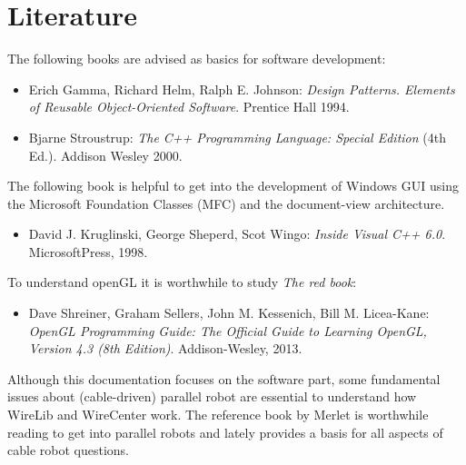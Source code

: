 \documentclass[11pt,a4paper,onepage,openany]{book}
\begin{document}
\appendix





\chapter{Literature}
The following books are advised as basics for software development:
\begin{itemize}
\item Erich Gamma, Richard Helm, Ralph E. Johnson: \emph{Design Patterns.
    Elements of Reusable Object-Oriented Software}. Prentice Hall 1994.

\item Bjarne Stroustrup: \emph{The C++ Programming Language: Special
    Edition}
    (4th Ed.). Addison Wesley 2000.
\end{itemize}
The following book is helpful to get into the development of Windows GUI using
the Microsoft Foundation Classes (MFC) and the document-view architecture.
\begin{itemize}
\item David J. Kruglinski, George Sheperd, Scot Wingo: \emph{Inside Visual
    C++ 6.0}. MicrosoftPress, 1998.
\end{itemize}
To understand openGL it is worthwhile to study \emph{The red book}:
\begin{itemize}
\item Dave Shreiner, Graham Sellers, John M. Kessenich, Bill M. Licea-Kane:
    \emph{OpenGL Programming Guide: The Official Guide to Learning OpenGL,
    Version 4.3 (8th Edition)}. Addison-Wesley, 2013.
\end{itemize}

Although this documentation focuses on the software part, some fundamental
issues about (cable-driven) parallel robot are essential to understand how
WireLib and WireCenter work. The reference book by Merlet \cite{Merlet2006} is
worthwhile reading to get into parallel robots and lately \cite{Pott2018}
provides a basis for all aspects of cable robot questions.
\end{document}
